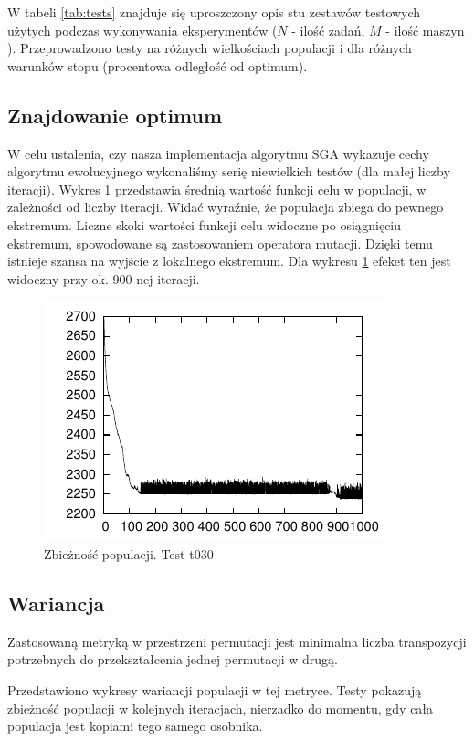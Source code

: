 \documentclass[12pt]{article}
\begin{document}
W tabeli \ref{tab:tests} znajduje się uproszczony opis stu zestawów testowych użytych
podczas wykonywania eksperymentów ($N$ - ilość zadań, $M$ - ilość maszyn ). Przeprowadzono testy na różnych wielkościach populacji i dla różnych warunków stopu
(procentowa odległość od optimum).

\subsection{Znajdowanie optimum}

W celu ustalenia, czy nasza implementacja algorytmu SGA wykazuje cechy algorytmu ewolucyjnego wykonaliśmy serię niewielkich testów (dla małej liczby iteracji).
Wykres \ref{pic:plot1} przedstawia średnią wartość funkcji celu w populacji, w zależności od liczby iteracji. Widać wyraźnie, że populacja zbiega do pewnego ekstremum.
Liczne skoki wartości funkcji celu widoczne po osiągnięciu ekstremum, spowodowane są zastosowaniem operatora mutacji. Dzięki temu istnieje szansa na wyjście z lokalnego ekstremum.
Dla wykresu \ref{pic:plot1} efeket ten jest widoczny przy ok. 900-nej iteracji. 

\begin{figure}
  \centering
  \includegraphics[scale=1.5]{plots/plot1.pdf}
  \caption{Zbieżność populacji. Test t030}
  \label{pic:plot1}
\end{figure}

\subsection{Wariancja}

Zastosowaną metryką w przestrzeni permutacji jest minimalna liczba
transpozycji potrzebnych do przekształcenia jednej permutacji w drugą.

Przedstawiono wykresy wariancji populacji w tej metryce. Testy
pokazują zbieżność populacji w kolejnych iteracjach, nierzadko do
momentu, gdy cała populacja jest kopiami tego samego osobnika.
\end{document}
